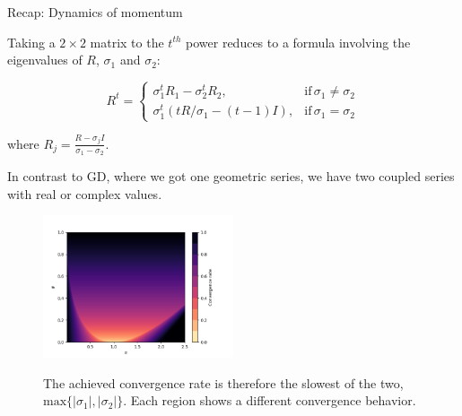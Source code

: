 \documentclass[11pt,compress,t,notes=noshow, xcolor=table]{beamer}
\begin{document}
\begin{vbframe}{Recap: Dynamics of momentum}
\framebreak

Taking a $2 \times 2$ matrix to the $t^{th}$ power reduces to a formula involving the eigenvalues of $R$, $\sigma_1$ and $\sigma_2$:

$$
R^t=\begin{cases}
\sigma_1^t R_1 - \sigma_2^t R_2, & \text{if} \, \sigma_1 \neq \sigma_2 \\
\sigma_1^t (t R/\sigma_1 - (t-1) I), & \text{if} \, \sigma_1 = \sigma_2 
\end{cases}
$$

where $R_j = \frac{R - \sigma_j I}{\sigma_1 - \sigma_2}$.


\vspace*{1.5cm}	
In contrast to GD, where we got one geometric series, we have two coupled series with real or complex values.

\framebreak
\begin{figure}
	\includegraphics[width=0.5\textwidth, keepaspectratio]{figure_man/momentum_convergence.png} \\
	\begin{footnotesize} 
		The achieved convergence rate is therefore the slowest of the two, $\text{max} \{|\sigma_1|, |\sigma_2| \}$. Each region shows a different convergence behavior. 
	\end{footnotesize}
\end{figure}

\framebreak



\end{vbframe}
\end{document}

